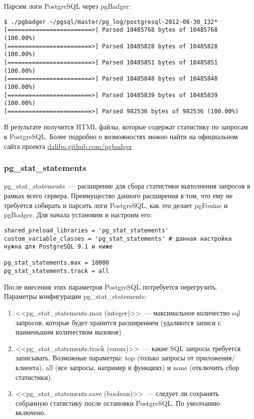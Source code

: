 Парсим логи PostgreSQL через pgBadger:

\begin{lstlisting}[label=lst:sql_performance11,caption=Запуск pgBadger]
$ ./pgbadger ~/pgsql/master/pg_log/postgresql-2012-08-30_132*
[========================>] Parsed 10485768 bytes of 10485768 (100.00%)
[========================>] Parsed 10485828 bytes of 10485828 (100.00%)
[========================>] Parsed 10485851 bytes of 10485851 (100.00%)
[========================>] Parsed 10485848 bytes of 10485848 (100.00%)
[========================>] Parsed 10485839 bytes of 10485839 (100.00%)
[========================>] Parsed 982536 bytes of 982536 (100.00%)
\end{lstlisting}

В результате получится HTML файлы, которые содержат статистику по запросам к PostgreSQL. Более подробно о возможностях можно найти на официальном сайта проекта \href{http://dalibo.github.com/pgbadger/}{dalibo.github.com/pgbadger}.

\subsubsection{pg\_stat\_statements}

pg\_stat\_statements~--- расширение для сбора статистики выполнения запросов в рамках всего сервера. Преимущество данного расширения в том, что ему не требуется собирать и парсить логи PostgreSQL, как это делает pgFouine и pgBadger. Для начала установим и настроим его:

\begin{lstlisting}[label=lst:sql_performance12,caption=Настройка pg\_stat\_statements в postgresql.conf]
shared_preload_libraries = 'pg_stat_statements'
custom_variable_classes = 'pg_stat_statements' # данная настройка нужна для PostgreSQL 9.1 и ниже

pg_stat_statements.max = 10000
pg_stat_statements.track = all
\end{lstlisting}

После внесения этих параметров PostgreSQL потребуется перегрузить. Параметры конфигурации pg\_stat\_statements:

\begin{enumerate}
  \item <<pg\_stat\_statements.max (integer)>>~--- максимальное количество sql запросов, которые будет хранится расширением (удаляются записи с наименьшим количеством вызовов)
  \item <<pg\_stat\_statements.track (enum)>>~--- какие SQL запросы требуется записывать. Возможные параметры: top (только запросы от приложения/клиента), all (все запросы, например в функциях) и none (отключить сбор статистики).
  \item <<pg\_stat\_statements.save (boolean)>>~--- следует ли сохранять собранную статистику после остановки PostgreSQL. По умолчанию включено.
\end{enumerate}

